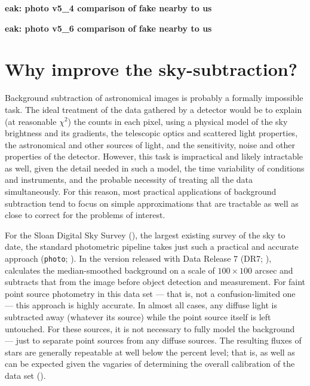 \documentclass[10pt,preprint]{aastex}
\begin{document}
{\bf eak: photo v5\_4 comparison of fake nearby to us}

{\bf eak: photo v5\_6 comparison of fake nearby to us}

\section{Why improve the sky-subtraction?}
\label{sec:intro}

Background subtraction of astronomical images is probably a formally
impossible task.  The ideal treatment of the data gathered by a
detector would be to explain (at reasonable $\chi^2$) the counts in
each pixel, using a physical model of the sky brightness and its
gradients, the telescopic optics and scattered light properties, the
astronomical and other sources of light, and the sensitivity, noise
and other properties of the detector.
However, this task is impractical and likely intractable as well,
given the detail needed in such a model, the time variability of
conditions and instruments, and the probable necessity of treating all
the data simultaneously. For this reason, most practical applications
of background subtraction tend to focus on simple approximations that
are tractable as well as close to correct for the problems of
interest.

For the Sloan Digital Sky Survey (\citealt{york00a}), the largest
existing survey of the sky to date, the standard photometric pipeline
takes just such a practical and accurate approach ({\tt photo};
\citealt{lupton01a}). In the version released with Data Release 7
(DR7; \citealt{abazajian09a}), calculates the median-smoothed
background on a scale of $100\times100$ arcsec and subtracts that from
the image before object detection and measurement. For faint point
source photometry in this data set --- that is, not a
confusion-limited one --- this approach is highly accurate. In almost
all cases, any diffuse light is subtracted away (whatever its source)
while the point source itself is left untouched. For these sources, it
is not necessary to fully model the background --- just to separate
point sources from any diffuse sources. The resulting fluxes of stars
are generally repeatable at well below the percent level; that is, as
well as can be expected given the vagaries of determining the overall
calibration of the data set (\citealt{padmanabhan07a}).
\end{document}
